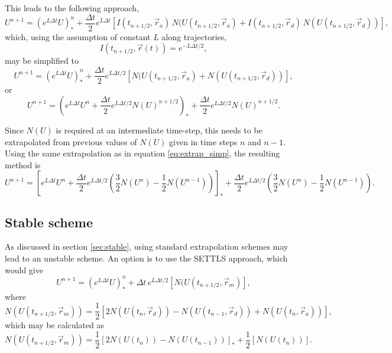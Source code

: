 \documentclass[10pt,a4paper]{article}
\begin{document}

This leads to the following approach,
\begin{equation}
U^{n+1}=(e^{L \Delta t} U)^{n}_{*}+\frac{\Delta t}{2}e^{L\Delta t}\left[ I(t_{n+1/2}, \vec{r}_a)\, N(U(t_{n+1/2}, \vec{r}_a)+I(t_{n+1/2}, \vec{r}_d)\, N(U(t_{n+1/2}, \vec{r}_d))\right],
\end{equation}
which, using the assumption of constant $L$ along trajectories,
\begin{equation}
 I(t_{n+1/2}, \vec{r}(t))=e^{-L\Delta t/2},
\end{equation} 
may be simplified to
\begin{equation}
U^{n+1}=(e^{L \Delta t} U)^{n}_{*}+\frac{\Delta t}{2}e^{L\Delta t/2}\left[ N(U(t_{n+1/2}, \vec{r}_a)+ N(U(t_{n+1/2}, \vec{r}_d))\right],
\end{equation}
or
\begin{equation}
U^{n+1}=\left(e^{L \Delta t} U^n +\frac{\Delta t}{2}e^{L\Delta t/2}N(U)^{n+1/2}\right)_{*}+\frac{\Delta t}{2}e^{L\Delta t/2} N(U)^{n+1/2}.
\end{equation}

Since $N(U)$ is required at an intermediate time-step, this needs to be extrapolated from previous values of $N(U)$ given in time steps $n$ and $n-1$. Using the same extrapolation as in equation \eqref{eq:extrap_simp}, the resulting method is
\begin{equation}
U^{n+1}=\left[e^{L \Delta t} U^n +\frac{\Delta t}{2}e^{L\Delta t/2}\left(\frac{3}{2}N(U^n)-\frac{1}{2}N(U^{n-1})\right)\right]_{*}+\frac{\Delta t}{2}e^{L\Delta t/2} \left(\frac{3}{2}N(U^n)-\frac{1}{2}N(U^{n-1})\right).
\end{equation}

\subsection{Stable scheme}


As discussed in section \ref{sec:stable}, using standard extrapolation schemes may lead to an unstable scheme. An option is to use the SETTLS approach, which would give
\begin{equation}
U^{n+1}=(e^{L \Delta t} U)^{n}_{*}+\Delta t \, e^{L\Delta t/2}\left[  N(U(t_{n+1/2}, \vec{r}_m)\right],
\end{equation}
where 
\begin{equation}
 N(U(t_{n+1/2}, \vec{r}_m)) = 
\frac{1}{2}\left[2 N(U(t_{n}, \vec{r}_d))- N(U(t_{n-1}, \vec{r}_d))+  N(U(t_{n}, \vec{r}_a))\right],
\end{equation}
which may be calculated as
\begin{equation}
 N(U(t_{n+1/2}, \vec{r}_m)) = 
\frac{1}{2}\left[ 2 N(U(t_{n}))- N(U(t_{n-1}))\right]_* +  \frac{1}{2}\left[N(U(t_{n}))\right].
\end{equation}
\end{document}
